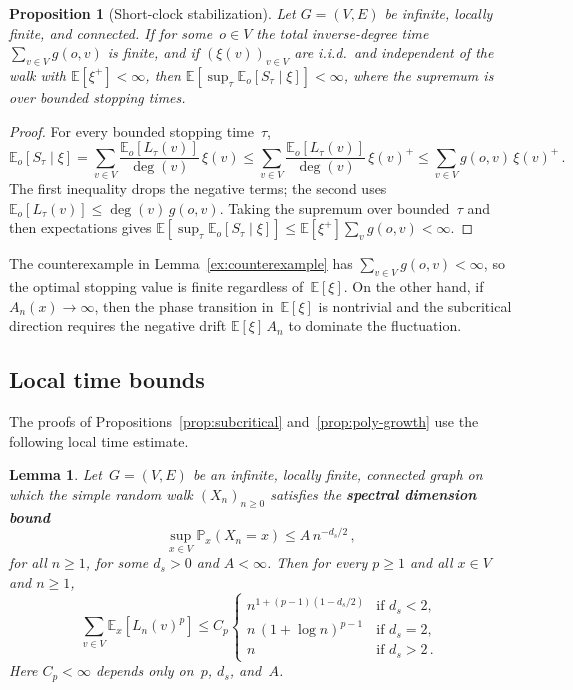 \documentclass[11pt]{amsart}
\theoremstyle{plain}
\newtheorem{proposition}[theorem]{Proposition}
\newtheorem{lemma}[theorem]{Lemma}
\theoremstyle{definition}
\newcommand{\E}{\mathbb{E}}
\renewcommand{\P}{\mathbb{P}}
\begin{document}
	\begin{proposition}[Short-clock stabilization]\label{prop:short-clock}
		Let $G=(V,E)$ be infinite, locally finite, and connected. If for some~$o \in V$ the total inverse-degree time $\sum_{v\in V}g(o,v)$ is finite, and if $(\xi(v))_{v\in V}$ are i.i.d.\ and independent of the walk with $\E[\xi^+]<\infty$, then $\E[\sup_\tau\E_o[S_\tau\mid\xi]] < \infty$, where the supremum is over bounded stopping times.
	\end{proposition}
	\begin{proof}
		For every bounded stopping time~$\tau$,
		\[
		\E_o[S_\tau\mid\xi]
		=\sum_{v\in V}\frac{\E_o[L_\tau(v)]}{\deg(v)}\,\xi(v)
		\leq\sum_{v\in V}\frac{\E_o[L_\tau(v)]}{\deg(v)}\,\xi(v)^+
		\leq\sum_{v\in V}g(o,v)\,\xi(v)^+\,.
		\]
		The first inequality drops the negative terms; the second uses $\E_o[L_\tau(v)]\leq\deg(v)\,g(o,v)$.
		Taking the supremum over bounded~$\tau$ and then expectations gives
		$\E[\sup_\tau\E_o[S_\tau\mid\xi]]\leq\E[\xi^+]\sum_v g(o,v)<\infty$.
	\end{proof}
	
	The counterexample in Lemma~\ref{ex:counterexample} has $\sum_{v\in V} g(o,v)<\infty$, so the optimal stopping value is finite regardless of~$\E[\xi]$. On the other hand, if $A_n(x)\to\infty$, then the phase transition in~$\E[\xi]$ is nontrivial and the subcritical direction requires the negative drift $\E[\xi]\,A_n$ to dominate the fluctuation.
	
	\subsection{Local time bounds}
	
	The proofs of Propositions~\ref{prop:subcritical} and~\ref{prop:poly-growth} use the following local time estimate.
	
	\begin{lemma}\label{lem:local-time}
		Let~$G = (V,E)$ be an infinite, locally finite, connected graph on which the simple random walk $(X_n)_{n\geq 0}$ satisfies the \textbf{spectral dimension bound}
		\begin{equation}\label{eq:return-bound}
			\sup_{x\in V}\P_x(X_n=x)\leq A\,n^{-d_s/2}\,,
		\end{equation}
		for all $n\geq 1$, for some $d_s>0$ and $A<\infty$.
		Then for every $p \geq 1$ and all $x \in V$ and $n \geq 1$,
		\[
		\sum_{v\in V} \E_x[L_n(v)^p] \leq C_p\begin{cases}
			n^{1+(p-1)(1-d_s/2)} & \text{if } d_s<2,\\[3pt]
			n\,(1+\log n)^{p-1} & \text{if } d_s=2,\\[3pt]
			n & \text{if } d_s>2\,.
		\end{cases}\,
		\]
		Here $C_p<\infty$ depends only on~$p$, $d_s$, and~$A$.
	\end{lemma}
	
\end{document}
